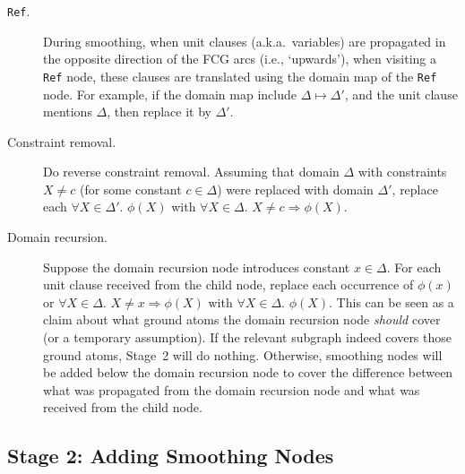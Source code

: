 \documentclass{article}
\theoremstyle{definition}
\begin{document}
\begin{description}
  \item[\texttt{Ref}.] During smoothing, when unit clauses (a.k.a.\ variables)
        are propagated in the opposite direction of the FCG arcs (i.e.,
        `upwards'), when visiting a \texttt{Ref} node, these clauses are
        translated using the domain map of the \texttt{Ref} node. For example,
        if the domain map include $\Delta \mapsto \Delta'$, and the unit clause
        mentions $\Delta$, then replace it by $\Delta'$.
  \item[Constraint removal.] Do reverse constraint removal. Assuming that
        domain $\Delta$ with constraints $X \ne c$ (for some constant
        $c \in \Delta$) were replaced with domain $\Delta'$, replace each
        $\forall X \in \Delta'\text{. }\phi(X)$ with
        $\forall X \in \Delta\text{. }X \ne c \Rightarrow \phi(X)$.
  \item[Domain recursion.] Suppose the domain recursion node introduces constant
        $x \in \Delta$. For each unit clause received from the child node,
        replace each occurrence of $\phi(x)$ or $\forall X \in \Delta\text{.
        } X \ne x \Rightarrow \phi(X)$ with $\forall X \in \Delta\text{.
        }\phi(X)$. This can be seen as a claim about what ground atoms the
        domain recursion node \emph{should} cover (or a temporary assumption).
        If the relevant subgraph indeed covers those ground atoms, Stage~2 will
        do nothing. Otherwise, smoothing nodes will be added below the domain
        recursion node to cover the difference between what was propagated from
        the domain recursion node and what was received from the child node.
\end{description}

\subsection{Stage 2: Adding Smoothing Nodes}

\end{document}

